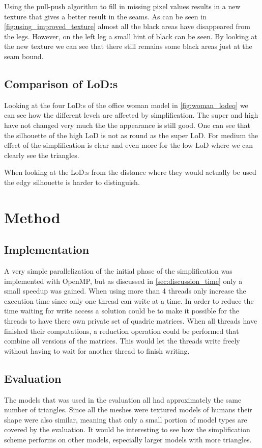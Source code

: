 Using the pull-push algorithm to fill in missing pixel values results in a new texture that gives a better result in the seams. As can be seen in \cref{fig:using_improved_texture} almost all the black areas have disappeared from the legs. However, on the left leg a small hint of black can be seen. By looking at the new texture we can see that there still remains some black areas just at the seam bound.


\subsection{Comparison of LoD:s} \label{sec:discussion_lod}
Looking at the four LoD:s of the office woman model in \cref{fig:woman_lodeq} we can see how the different levels are affected by simplification. The super and high have not changed very much the the appearance is still good. One can see that the silhouette of the high LoD is not as round as the super LoD. For medium the effect of the simplification is clear and even more for the low LoD where we can clearly see the triangles.

When looking at the LoD:s from the distance where they would actually be used the edgy silhouette is harder to distinguish. 

\clearpage

\section{Method} \label{sec:discussion_method}
\subsection{Implementation}
A very simple parallelization of the initial phase of the simplification was implemented with OpenMP, but as discussed in \cref{sec:discussion_time} only a small speedup was gained. When using more than 4 threads only increase the execution time since only one thread can write at a time. In order to reduce the time waiting for write access a solution could be to make it possible for the threads to have there own private set of quadric matrices. When all threads have finished their computations, a reduction operation could be performed that combine all versions of the matrices. This would let the threads write freely without having to wait for another thread to finish writing.



\subsection{Evaluation}
The models that was used in the evaluation all had approximately the same number of triangles. Since all the meshes were textured models of humans their shape were also similar, meaning that only a small portion of model types are covered by the evaluation. It would be interesting to see how the simplification scheme performs on other models, especially larger models with more triangles.

